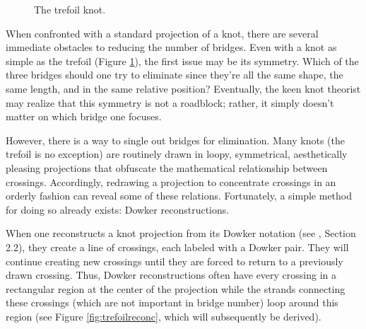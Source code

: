 \documentclass[titlepage,11pt]{article}
\begin{document}
\begin{figure}[h!]
    \centering
    \vspace{-2.3em}
    \caption{The trefoil knot.}
    \label{fig:trefoil}
\end{figure}

\noindent When confronted with a standard projection of a knot, there are several immediate obstacles to reducing the number of bridges. Even with a knot as simple as the trefoil (Figure \ref{fig:trefoil}), the first issue may be its symmetry. Which of the three bridges should one try to eliminate since they're all the same shape, the same length, and in the same relative position? Eventually, the keen knot theorist may realize that this symmetry is not a roadblock; rather, it simply doesn't matter on which bridge one focuses.\par
However, there is a way to single out bridges for elimination. Many knots (the trefoil is no exception) are routinely drawn in loopy, symmetrical, aesthetically pleasing projections that obfuscate the mathematical relationship between crossings. Accordingly, redrawing a projection to concentrate crossings in an orderly fashion can reveal some of these relations. Fortunately, a simple method for doing so already exists: Dowker reconstructions.\par
When one reconstructs a knot projection from its Dowker notation (see \cite{bib:knotnotes}, Section 2.2), they create a line of crossings, each labeled with a Dowker pair. They will continue creating new crossings until they are forced to return to a previously drawn crossing. Thus, Dowker reconstructions often have every crossing in a rectangular region at the center of the projection while the strands connecting these crossings (which are not important in bridge number) loop around this region (see Figure \ref{fig:trefoilreconc}, which will subsequently be derived).\par
\end{document}
